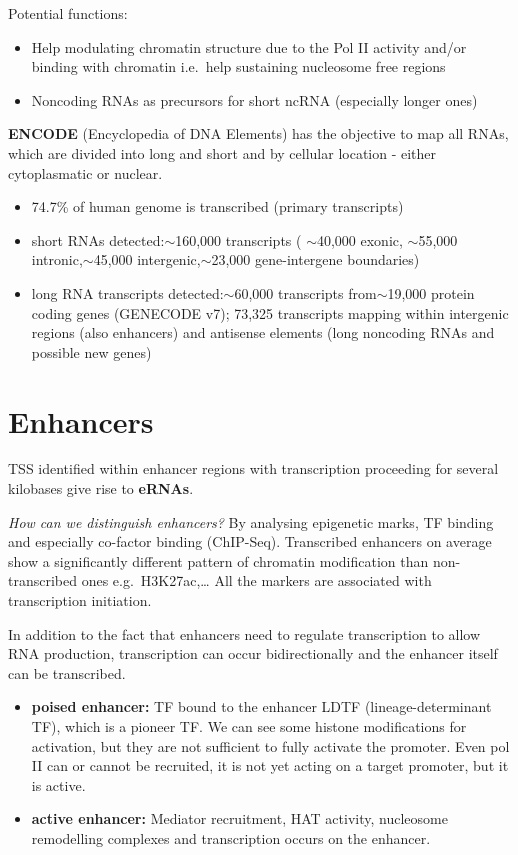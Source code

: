 Potential functions:
\begin{itemize}
\item Help modulating chromatin structure due to the Pol II activity and/or binding with chromatin i.e.~help sustaining nucleosome free regions
\item  Noncoding RNAs as precursors for short ncRNA (especially longer ones)
\end{itemize}

\textbf{ENCODE} (Encyclopedia of DNA Elements) has the objective to map all RNAs, which are divided into long and short and by cellular location - either cytoplasmatic or nuclear.

\begin{itemize}
\tightlist
\item
  74.7\% of human genome is transcribed (primary transcripts)
\item
  short RNAs detected:$\sim$160,000 transcripts ( $\sim$40,000 exonic, $\sim$55,000 intronic,$\sim$45,000 intergenic,$\sim$23,000 gene-intergene boundaries)
\item
  long RNA transcripts detected:$\sim$60,000 transcripts from$\sim$19,000 protein coding genes (GENECODE v7); 73,325 transcripts mapping within intergenic regions (also enhancers) and antisense elements (long noncoding RNAs and possible new genes)
\end{itemize}

\section{Enhancers}
TSS identified within enhancer regions with transcription proceeding for several kilobases give rise to \textbf{eRNAs}.

\emph{How can we distinguish enhancers?} By analysing epigenetic marks, TF binding and especially co-factor binding (ChIP-Seq). Transcribed enhancers on average show a significantly different pattern of chromatin modification than non-transcribed ones e.g.~H3K27ac,\ldots{} All the markers are associated with transcription initiation.

In addition to the fact that enhancers need to regulate transcription to allow RNA production, transcription can occur bidirectionally and the enhancer itself can be transcribed.

\begin{itemize}
\tightlist
\item
  \textbf{poised enhancer:} TF bound to the enhancer LDTF (lineage-determinant TF), which is a pioneer TF. We can see some histone modifications for activation, but they are not sufficient to fully activate the promoter. Even pol II can or cannot be recruited, it is not yet acting on a target promoter, but it is active.
\item
  \textbf{active enhancer:} Mediator recruitment, HAT activity, nucleosome remodelling complexes and transcription occurs on the enhancer.
\end{itemize}

